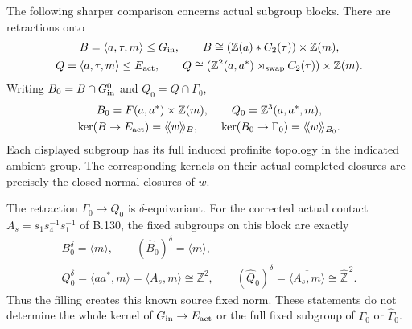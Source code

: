 The following sharper comparison concerns actual subgroup blocks.
There are retractions onto
\begin{equation}\label{eq:B135-blocks}
 \begin{gathered}
 B=\langle a,\tau,m\rangle\leq G_{\rm in},\qquad
 B\cong(\mathbb Z(a)*C_2(\tau))\times\mathbb Z(m),\\
 Q=\langle a,\tau,m\rangle\leq E_{\rm act},\qquad
 Q\cong(\mathbb Z^2(a,a^*)\rtimes_{\rm swap}C_2(\tau))
                  \times\mathbb Z(m).
 \end{gathered}
\end{equation}
Writing $B_0=B\cap G_{\rm in}^0$ and $Q_0=Q\cap\Gamma_0$,
\begin{equation}\label{eq:B135-block-kernels}
 \begin{gathered}
 B_0=F(a,a^*)\times\mathbb Z(m),\qquad Q_0=\mathbb Z^3(a,a^*,m),\\
 \ker(B\to E_{\rm act})=\langle\!\langle w\rangle\!\rangle_B,
 \qquad
 \ker(B_0\to\Gamma_0)=\langle\!\langle w\rangle\!\rangle_{B_0}.
 \end{gathered}
\end{equation}
Each displayed subgroup has its full induced profinite topology
in the indicated ambient group. The corresponding kernels on
their actual completed closures are precisely the closed normal
closures of $w$.

The retraction $\Gamma_0\to Q_0$ is $\delta$-equivariant.
For the corrected actual contact
$A_s=s_1s_4^{-1}s_1^{-1}$ of B.130, the fixed subgroups on this
block are exactly
\begin{equation}\label{eq:B135-fixed-creation}
 \begin{gathered}
 B_0^\delta=\langle m\rangle,\qquad
 (\widehat B_0)^\delta=\overline{\langle m\rangle},\\
 Q_0^\delta=\langle aa^*,m\rangle
             =\langle A_s,m\rangle\cong\mathbb Z^2,\qquad
 (\widehat Q_0)^\delta
             =\overline{\langle A_s,m\rangle}\cong\widehat{\mathbb Z}^{\,2}.
 \end{gathered}
\end{equation}
Thus the filling creates this known source fixed norm. These
statements do not determine the whole kernel of
$G_{\rm in}\to E_{\rm act}$ or the full fixed subgroup of
$\Gamma_0$ or $\widehat\Gamma_0$.

